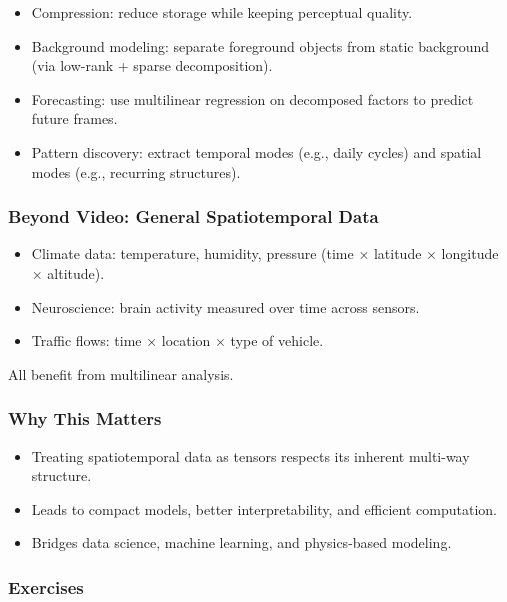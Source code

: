 \documentclass[
  letterpaper,
  DIV=11,
  numbers=noendperiod]{scrreprt}
\providecommand{\tightlist}{%
  \setlength{\itemsep}{0pt}\setlength{\parskip}{0pt}}
\begin{document}
\begin{itemize}
\tightlist
\item
  Compression: reduce storage while keeping perceptual quality.
\item
  Background modeling: separate foreground objects from static
  background (via low-rank + sparse decomposition).
\item
  Forecasting: use multilinear regression on decomposed factors to
  predict future frames.
\item
  Pattern discovery: extract temporal modes (e.g., daily cycles) and
  spatial modes (e.g., recurring structures).
\end{itemize}

\subsubsection{Beyond Video: General Spatiotemporal
Data}\label{beyond-video-general-spatiotemporal-data}

\begin{itemize}
\tightlist
\item
  Climate data: temperature, humidity, pressure (time × latitude ×
  longitude × altitude).
\item
  Neuroscience: brain activity measured over time across sensors.
\item
  Traffic flows: time × location × type of vehicle.
\end{itemize}

All benefit from multilinear analysis.

\subsubsection{Why This Matters}\label{why-this-matters-46}

\begin{itemize}
\tightlist
\item
  Treating spatiotemporal data as tensors respects its inherent
  multi-way structure.
\item
  Leads to compact models, better interpretability, and efficient
  computation.
\item
  Bridges data science, machine learning, and physics-based modeling.
\end{itemize}

\subsubsection{Exercises}\label{exercises-60}
\end{document}
